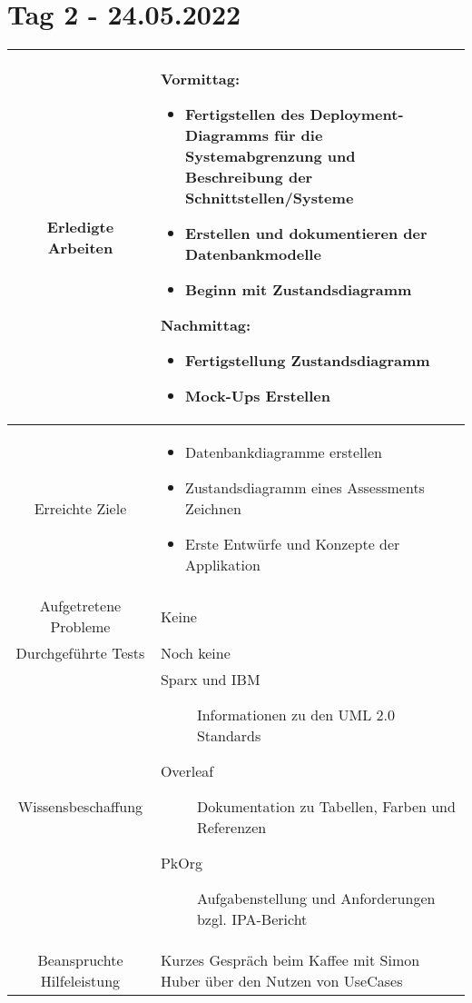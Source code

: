 \section{Tag 2 - 24.05.2022}

\begin{tabularx}{\textwidth}[H]{|c|X|}
    \hline
    Erledigte Arbeiten &
    \textbf{Vormittag:}
    \begin{itemize}
        \item Fertigstellen des Deployment-Diagramms für die Systemabgrenzung und Beschreibung der Schnittstellen/Systeme
        \item Erstellen und dokumentieren der Datenbankmodelle
        \item Beginn mit Zustandsdiagramm 
    \end{itemize}
    \textbf{Nachmittag:}
    \begin{itemize}
        \item Fertigstellung Zustandsdiagramm
        \item Mock-Ups Erstellen
    \end{itemize}
    \\ \hline

    Erreichte Ziele &
    \begin{itemize}
        \item Datenbankdiagramme erstellen
        \item Zustandsdiagramm eines Assessments Zeichnen
        \item Erste Entwürfe und Konzepte der Applikation
    \end{itemize}
    \\ \hline

    Aufgetretene Probleme &
    Keine
    \\ \hline

    Durchgeführte Tests &
    Noch keine
    \\ \hline

    Wissensbeschaffung &
    \begin{description}
        \item[Sparx und IBM] Informationen zu den UML 2.0 Standards
        \item[Overleaf] Dokumentation zu Tabellen, Farben und Referenzen
        \item[PkOrg] Aufgabenstellung und Anforderungen bzgl. IPA-Bericht
    \end{description}
    \\ \hline

    Beanspruchte Hilfeleistung &
    Kurzes Gespräch beim Kaffee mit Simon Huber über den Nutzen von UseCases
    \\ \hline


\end{tabularx}
